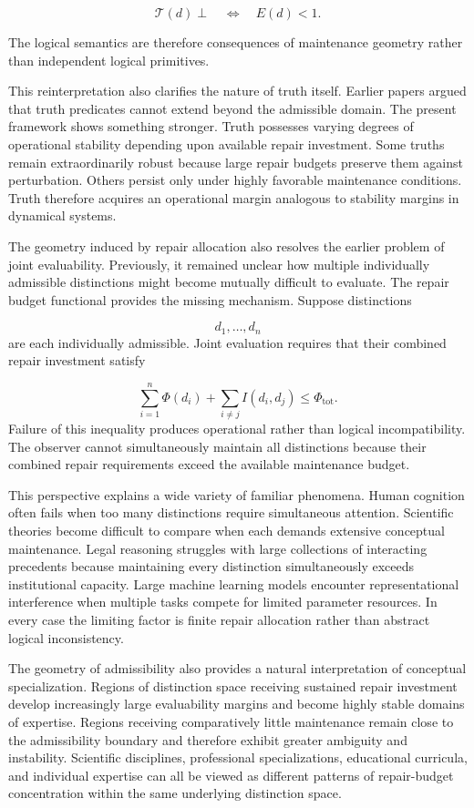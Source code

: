 \documentclass[12pt,oneside]{article}
\theoremstyle{plain}
\theoremstyle{definition}
\theoremstyle{remark}
\begin{document}
\[
\mathcal T(d)
\perp
\quad
\Longleftrightarrow
\quad
E(d)<1.
\]

The logical semantics are therefore consequences of maintenance geometry rather than independent logical primitives.

This reinterpretation also clarifies the nature of truth itself. Earlier papers argued that truth predicates cannot extend beyond the admissible domain. The present framework shows something stronger. Truth possesses varying degrees of operational stability depending upon available repair investment. Some truths remain extraordinarily robust because large repair budgets preserve them against perturbation. Others persist only under highly favorable maintenance conditions. Truth therefore acquires an operational margin analogous to stability margins in dynamical systems.

The geometry induced by repair allocation also resolves the earlier problem of joint evaluability. Previously, it remained unclear how multiple individually admissible distinctions might become mutually difficult to evaluate. The repair budget functional provides the missing mechanism. Suppose distinctions

\[
d_1,\ldots,d_n
\]
are each individually admissible. Joint evaluation requires that their combined repair investment satisfy

\[
\sum_{i=1}^{n}
\Phi(d_i)
+
\sum_{i\neq j}
I(d_i,d_j)
\le
\Phi_{\mathrm{tot}}.
\]
Failure of this inequality produces operational rather than logical incompatibility. The observer cannot simultaneously maintain all distinctions because their combined repair requirements exceed the available maintenance budget.

This perspective explains a wide variety of familiar phenomena. Human cognition often fails when too many distinctions require simultaneous attention. Scientific theories become difficult to compare when each demands extensive conceptual maintenance. Legal reasoning struggles with large collections of interacting precedents because maintaining every distinction simultaneously exceeds institutional capacity. Large machine learning models encounter representational interference when multiple tasks compete for limited parameter resources. In every case the limiting factor is finite repair allocation rather than abstract logical inconsistency.

The geometry of admissibility also provides a natural interpretation of conceptual specialization. Regions of distinction space receiving sustained repair investment develop increasingly large evaluability margins and become highly stable domains of expertise. Regions receiving comparatively little maintenance remain close to the admissibility boundary and therefore exhibit greater ambiguity and instability. Scientific disciplines, professional specializations, educational curricula, and individual expertise can all be viewed as different patterns of repair-budget concentration within the same underlying distinction space.
\end{document}
